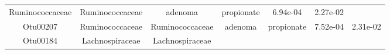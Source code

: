 \documentclass[11pt,]{article}
\begin{document}
\begin{longtable}[]{@{}ccccccc@{}}
\begin{minipage}[t]{0.17\columnwidth}
Ruminococcaceae\strut
\end{minipage} & \begin{minipage}[t]{0.17\columnwidth}\centering\strut
Ruminococcaceae\strut
\end{minipage} & \begin{minipage}[t]{0.09\columnwidth}\centering\strut
adenoma\strut
\end{minipage} & \begin{minipage}[t]{0.11\columnwidth}\centering\strut
propionate\strut
\end{minipage} & \begin{minipage}[t]{0.09\columnwidth}\centering\strut
6.94e-04\strut
\end{minipage} & \begin{minipage}[t]{0.09\columnwidth}\centering\strut
2.27e-02\strut
\end{minipage}\tabularnewline
\begin{minipage}[t]{0.09\columnwidth}\centering\strut
Otu00207\strut
\end{minipage} & \begin{minipage}[t]{0.17\columnwidth}\centering\strut
Ruminococcaceae\strut
\end{minipage} & \begin{minipage}[t]{0.17\columnwidth}\centering\strut
Ruminococcaceae\strut
\end{minipage} & \begin{minipage}[t]{0.09\columnwidth}\centering\strut
adenoma\strut
\end{minipage} & \begin{minipage}[t]{0.11\columnwidth}\centering\strut
propionate\strut
\end{minipage} & \begin{minipage}[t]{0.09\columnwidth}\centering\strut
7.52e-04\strut
\end{minipage} & \begin{minipage}[t]{0.09\columnwidth}\centering\strut
2.31e-02\strut
\end{minipage}\tabularnewline
\begin{minipage}[t]{0.09\columnwidth}\centering\strut
Otu00184\strut
\end{minipage} & \begin{minipage}[t]{0.17\columnwidth}\centering\strut
Lachnospiraceae\strut
\end{minipage} & \begin{minipage}[t]{0.17\columnwidth}\centering\strut
Lachnospiraceae\strut
\end{minipage} & \begin{minipage}[t]{0.09\columnwidth}\centering\strut

\end{minipage}
\end{longtable}
\end{document}
